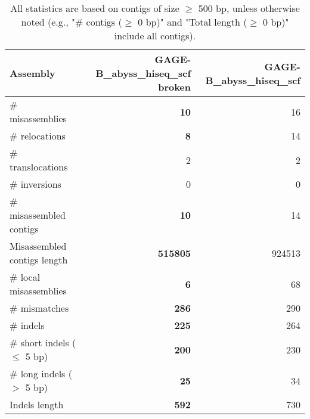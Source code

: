 \documentclass[12pt,a4paper]{article}
\begin{document}
\begin{table}[ht]
\begin{center}
\caption{All statistics are based on contigs of size $\geq$ 500 bp, unless otherwise noted (e.g., "\# contigs ($\geq$ 0 bp)" and "Total length ($\geq$ 0 bp)" include all contigs).}
\begin{tabular}{|l*{2}{|r}|}
\hline
Assembly & GAGE-B\_abyss\_hiseq\_scf broken & GAGE-B\_abyss\_hiseq\_scf \\ \hline
\# misassemblies & {\bf 10} & 16 \\ \hline
\hspace{5mm}\# relocations & {\bf 8} & 14 \\ \hline
\hspace{5mm}\# translocations & 2 & 2 \\ \hline
\hspace{5mm}\# inversions & 0 & 0 \\ \hline
\# misassembled contigs & {\bf 10} & 14 \\ \hline
Misassembled contigs length & {\bf 515805} & 924513 \\ \hline
\# local misassemblies & {\bf 6} & 68 \\ \hline
\# mismatches & {\bf 286} & 290 \\ \hline
\# indels & {\bf 225} & 264 \\ \hline
\hspace{5mm}\# short indels ($\leq$ 5 bp) & {\bf 200} & 230 \\ \hline
\hspace{5mm}\# long indels ($>$ 5 bp) & {\bf 25} & 34 \\ \hline
Indels length & {\bf 592} & 730 \\ \hline
\end{tabular}
\end{center}
\end{table}
\end{document}
